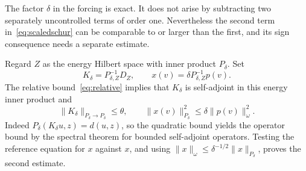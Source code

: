 \documentclass[11pt,a4paper]{article}
\numberwithin{equation}{section}
\theoremstyle{remark}
\newcommand{\norm}[1]{\lVert #1\rVert}
\begin{document}
The factor $\delta$ in the forcing is exact. It does not arise by subtracting two separately uncontrolled terms of order one. Nevertheless the second term in~\eqref{eq:scaledschur} can be comparable to or larger than the first, and its sign consequence needs a separate estimate.

Regard $Z$ as the energy Hilbert space with inner product $P_\delta$. Set
\begin{equation}\label{eq:Kx}
 K_\delta=P_{\delta,Z}^{-1}D_Z,\qquad
 x(v)=\delta P_{\delta,Z}^{-1}p(v).
\end{equation}
The relative bound~\eqref{eq:relative} implies that $K_\delta$ is self-adjoint in this energy inner product and
\begin{equation}\label{eq:contraction}
 \norm{K_\delta}_{P_\delta\to P_\delta}\le\theta,
 \qquad \norm{x(v)}_{P_\delta}^2\le\delta\norm{p(v)}_\omega^2.
\end{equation}
Indeed $P_\delta(K_\delta u,z)=d(u,z)$, so the quadratic bound yields the operator bound by the spectral theorem for bounded self-adjoint operators. Testing the reference equation for $x$ against $x$, and using
$\norm x_\omega\le\delta^{-1/2}\norm x_{P_\delta}$, proves the second estimate.
\end{document}
